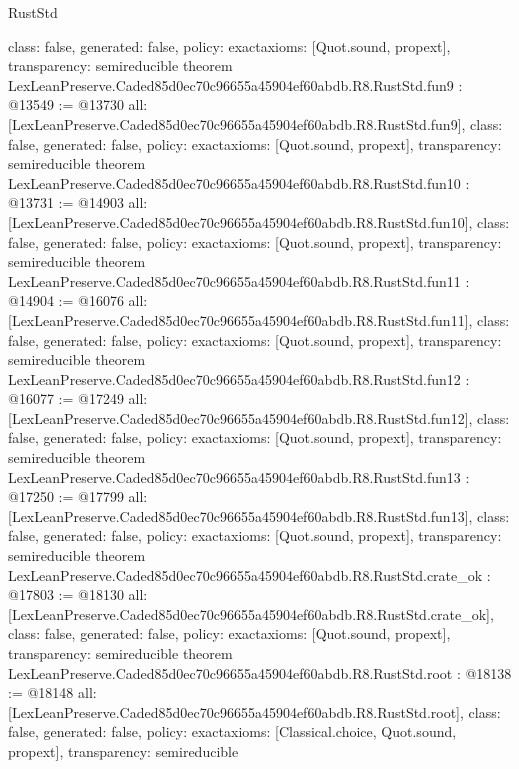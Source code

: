 \begin{lexlean}{RustStd}
\begin{coremodule}
{  class: false,
  generated: false,
  policy: exact{axioms: [Quot.sound, propext]},
  transparency: semireducible
}
theorem LexLeanPreserve.Caded85d0ec70c96655a45904ef60abdb.R8.RustStd.fun9 : @13549 := @13730 {
  all: [LexLeanPreserve.Caded85d0ec70c96655a45904ef60abdb.R8.RustStd.fun9],
  class: false,
  generated: false,
  policy: exact{axioms: [Quot.sound, propext]},
  transparency: semireducible
}
theorem LexLeanPreserve.Caded85d0ec70c96655a45904ef60abdb.R8.RustStd.fun10 : @13731 := @14903 {
  all: [LexLeanPreserve.Caded85d0ec70c96655a45904ef60abdb.R8.RustStd.fun10],
  class: false,
  generated: false,
  policy: exact{axioms: [Quot.sound, propext]},
  transparency: semireducible
}
theorem LexLeanPreserve.Caded85d0ec70c96655a45904ef60abdb.R8.RustStd.fun11 : @14904 := @16076 {
  all: [LexLeanPreserve.Caded85d0ec70c96655a45904ef60abdb.R8.RustStd.fun11],
  class: false,
  generated: false,
  policy: exact{axioms: [Quot.sound, propext]},
  transparency: semireducible
}
theorem LexLeanPreserve.Caded85d0ec70c96655a45904ef60abdb.R8.RustStd.fun12 : @16077 := @17249 {
  all: [LexLeanPreserve.Caded85d0ec70c96655a45904ef60abdb.R8.RustStd.fun12],
  class: false,
  generated: false,
  policy: exact{axioms: [Quot.sound, propext]},
  transparency: semireducible
}
theorem LexLeanPreserve.Caded85d0ec70c96655a45904ef60abdb.R8.RustStd.fun13 : @17250 := @17799 {
  all: [LexLeanPreserve.Caded85d0ec70c96655a45904ef60abdb.R8.RustStd.fun13],
  class: false,
  generated: false,
  policy: exact{axioms: [Quot.sound, propext]},
  transparency: semireducible
}
theorem LexLeanPreserve.Caded85d0ec70c96655a45904ef60abdb.R8.RustStd.crate_ok : @17803 := @18130 {
  all: [LexLeanPreserve.Caded85d0ec70c96655a45904ef60abdb.R8.RustStd.crate_ok],
  class: false,
  generated: false,
  policy: exact{axioms: [Quot.sound, propext]},
  transparency: semireducible
}
theorem LexLeanPreserve.Caded85d0ec70c96655a45904ef60abdb.R8.RustStd.root : @18138 := @18148 {
  all: [LexLeanPreserve.Caded85d0ec70c96655a45904ef60abdb.R8.RustStd.root],
  class: false,
  generated: false,
  policy: exact{axioms: [Classical.choice, Quot.sound, propext]},
  transparency: semireducible
}


\end{coremodule}
\end{lexlean}
